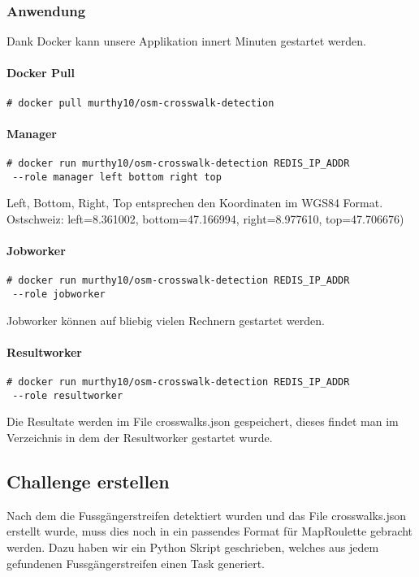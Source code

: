 \subsubsection{Anwendung}
Dank Docker kann unsere Applikation innert Minuten gestartet werden.

\paragraph{Docker Pull}
\begin{lstlisting}[style=BashInputStyle]
	# docker pull murthy10/osm-crosswalk-detection
\end{lstlisting}

\paragraph{Manager}
\begin{lstlisting}[style=BashInputStyle]
 # docker run murthy10/osm-crosswalk-detection REDIS_IP_ADDR 
 --role manager left bottom right top
\end{lstlisting}
Left, Bottom, Right, Top entsprechen den Koordinaten im WGS84 Format. \\
Ostschweiz: left=8.361002, bottom=47.166994, right=8.977610, top=47.706676) 

\paragraph{Jobworker}
\begin{lstlisting}[style=BashInputStyle]
 # docker run murthy10/osm-crosswalk-detection REDIS_IP_ADDR 
 --role jobworker
\end{lstlisting}
Jobworker können auf bliebig vielen Rechnern gestartet werden.\\

\paragraph{Resultworker}
\begin{lstlisting}[style=BashInputStyle]
 # docker run murthy10/osm-crosswalk-detection REDIS_IP_ADDR 
 --role resultworker
\end{lstlisting}
Die Resultate werden im File crosswalks.json gespeichert, dieses findet man im Verzeichnis in dem der Resultworker gestartet wurde.
\newpage

\subsection{Challenge erstellen}
Nach dem die Fussgängerstreifen detektiert wurden und das File crosswalks.json erstellt wurde, muss dies noch in ein passendes Format für MapRoulette gebracht werden. Dazu haben wir ein Python Skript geschrieben, welches aus jedem gefundenen Fussgängerstreifen einen Task generiert.

